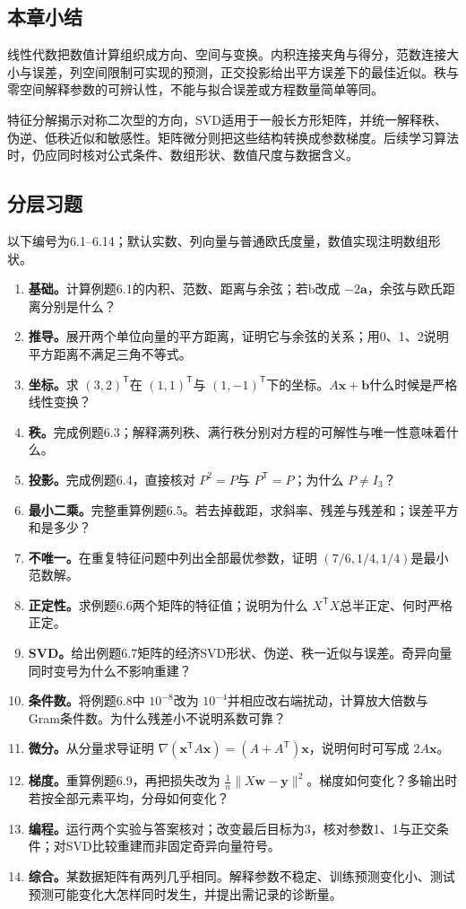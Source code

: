 \documentclass[UTF8,fontset=none,zihao=-4,a4paper]{ctexart}
\numberwithin{equation}{section}
\numberwithin{figure}{section}
\begin{document}
\subsection{本章小结}
线性代数把数值计算组织成方向、空间与变换。内积连接夹角与得分，范数连接大小与误差，列空间限制可实现的预测，正交投影给出平方误差下的最佳近似。秩与零空间解释参数的可辨认性，不能与拟合误差或方程数量简单等同。

特征分解揭示对称二次型的方向，SVD适用于一般长方形矩阵，并统一解释秩、伪逆、低秩近似和敏感性。矩阵微分则把这些结构转换成参数梯度。后续学习算法时，仍应同时核对公式条件、数组形状、数值尺度与数据含义。

\clearpage
\subsection{分层习题}
以下编号为6.1--6.14；默认实数、列向量与普通欧氏度量，数值实现注明数组形状。
\begin{enumerate}[label=\textbf{6.\arabic*}]
\item \textbf{基础。}计算例题6.1的内积、范数、距离与余弦；若b改成 $-2\symbf a$，余弦与欧氏距离分别是什么？
\item \textbf{推导。}展开两个单位向量的平方距离，证明它与余弦的关系；用0、1、2说明平方距离不满足三角不等式。
\item \textbf{坐标。}求 $(3,2)^{\mathsf T}$在 $(1,1)^{\mathsf T}$与 $(1,-1)^{\mathsf T}$下的坐标。$A\symbf x+\symbf b$什么时候是严格线性变换？
\item \textbf{秩。}完成例题6.3；解释满列秩、满行秩分别对方程的可解性与唯一性意味着什么。
\item \textbf{投影。}完成例题6.4，直接核对 $P^2=P$与 $P^{\mathsf T}=P$；为什么 $P\ne I_3$？
\item \textbf{最小二乘。}完整重算例题6.5。若去掉截距，求斜率、残差与残差和；误差平方和是多少？
\item \textbf{不唯一。}在重复特征问题中列出全部最优参数，证明 $(7/6,1/4,1/4)$是最小范数解。
\item \textbf{正定性。}求例题6.6两个矩阵的特征值；说明为什么 $X^{\mathsf T}X$总半正定、何时严格正定。
\item \textbf{SVD。}给出例题6.7矩阵的经济SVD形状、伪逆、秩一近似与误差。奇异向量同时变号为什么不影响重建？
\item \textbf{条件数。}将例题6.8中 $10^{-8}$改为 $10^{-4}$并相应改右端扰动，计算放大倍数与Gram条件数。为什么残差小不说明系数可靠？
\item \textbf{微分。}从分量求导证明 $\nabla(\symbf x^{\mathsf T}A\symbf x)=(A+A^{\mathsf T})\symbf x$，说明何时可写成 $2A\symbf x$。
\item \textbf{梯度。}重算例题6.9，再把损失改为 $\frac1n\|X\symbf w-\symbf y\|^2$。梯度如何变化？多输出时若按全部元素平均，分母如何变化？
\item \textbf{编程。}运行两个实验与答案核对；改变最后目标为3，核对参数1、1与正交条件；对SVD比较重建而非固定奇异向量符号。
\item \textbf{综合。}某数据矩阵有两列几乎相同。解释参数不稳定、训练预测变化小、测试预测可能变化大怎样同时发生，并提出需记录的诊断量。
\end{enumerate}
\end{document}
